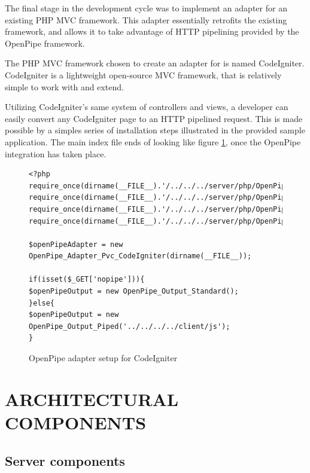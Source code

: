 \documentclass[12pt]{report}
\begin{document}
The final stage in the development cycle was to implement an adapter for an existing PHP MVC framework. This adapter essentially retrofits the existing framework, and allows it to take advantage of HTTP pipelining provided by the OpenPipe framework. 

The PHP MVC framework chosen to create an adapter for is named CodeIgniter. CodeIgniter is a lightweight open-source MVC framework, that is relatively simple to work with and extend. 

Utilizing CodeIgniter’s same system of controllers and views, a developer can easily convert any CodeIgniter page to an HTTP pipelined request. This is made possible by a simples series of installation steps illustrated in the provided sample application. The main index file ends of looking like figure \ref{fig:codeIgniterPvcCode}, once the OpenPipe integration has taken place.

\begin{figure}[H]
\label{fig:codeIgniterPvcCode}
\begin{lstlisting}
<?php
require_once(dirname(__FILE__).'/../../../server/php/OpenPipe/Adapter/Pvc/CodeIgniter.php');
require_once(dirname(__FILE__).'/../../../server/php/OpenPipe/Output/Piped.php');
require_once(dirname(__FILE__).'/../../../server/php/OpenPipe/Output/Standard.php');
require_once(dirname(__FILE__).'/../../../server/php/OpenPipe/Runner.php');

$openPipeAdapter = new OpenPipe_Adapter_Pvc_CodeIgniter(dirname(__FILE__));

if(isset($_GET['nopipe'])){
$openPipeOutput = new OpenPipe_Output_Standard();	
}else{
$openPipeOutput = new OpenPipe_Output_Piped('../../../../client/js');	
}
\end{lstlisting}
\caption{OpenPipe adapter setup for CodeIgniter}
\end{figure}





\chapter{ARCHITECTURAL COMPONENTS}

\section{Server components}
\end{document}
